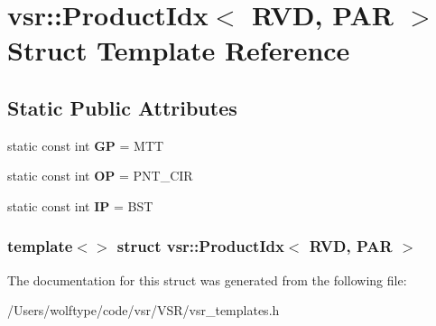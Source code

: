 \hypertarget{structvsr_1_1_product_idx_3_01_r_v_d_00_01_p_a_r_01_4}{\section{vsr\-:\-:Product\-Idx$<$ R\-V\-D, P\-A\-R $>$ Struct Template Reference}
\label{structvsr_1_1_product_idx_3_01_r_v_d_00_01_p_a_r_01_4}
}
\subsection*{Static Public Attributes}
\begin{DoxyCompactItemize}
\item 
\hypertarget{structvsr_1_1_product_idx_3_01_r_v_d_00_01_p_a_r_01_4_a6ae8aea0caf9e15f6f2d7ee167ce698e}{static const int {\bfseries G\-P} = M\-T\-T}\label{structvsr_1_1_product_idx_3_01_r_v_d_00_01_p_a_r_01_4_a6ae8aea0caf9e15f6f2d7ee167ce698e}

\item 
\hypertarget{structvsr_1_1_product_idx_3_01_r_v_d_00_01_p_a_r_01_4_af05b1c1353ef7f157f8612863a83ffcc}{static const int {\bfseries O\-P} = P\-N\-T\-\_\-\-C\-I\-R}\label{structvsr_1_1_product_idx_3_01_r_v_d_00_01_p_a_r_01_4_af05b1c1353ef7f157f8612863a83ffcc}

\item 
\hypertarget{structvsr_1_1_product_idx_3_01_r_v_d_00_01_p_a_r_01_4_a246e8e0d2cee7d1df3dbf8348d239e66}{static const int {\bfseries I\-P} = B\-S\-T}\label{structvsr_1_1_product_idx_3_01_r_v_d_00_01_p_a_r_01_4_a246e8e0d2cee7d1df3dbf8348d239e66}

\end{DoxyCompactItemize}
\subsubsection*{template$<$$>$ struct vsr\-::\-Product\-Idx$<$ R\-V\-D, P\-A\-R $>$}



The documentation for this struct was generated from the following file\-:\begin{DoxyCompactItemize}
\item 
/\-Users/wolftype/code/vsr/\-V\-S\-R/vsr\-\_\-templates.\-h\end{DoxyCompactItemize}
